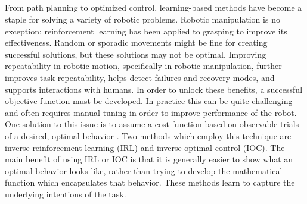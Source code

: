 \documentclass{article}
\begin{document}
\subsection{}

    
    From path planning to optimized control, learning-based methods have become a staple for solving a variety of robotic problems. Robotic manipulation is no exception; reinforcement learning has been applied to grasping to improve its effectiveness. Random or sporadic movements might be fine for creating successful solutions, but these solutions may not be optimal. Improving repeatability in robotic motion, specifically in robotic manipulation, further improves task repeatability, helps detect failures and recovery modes, and supports interactions with humans\cite{kalakrishnan2013learning}. In order to unlock these benefits, a successful objective function must be developed. In practice this can be quite challenging and often requires manual tuning in order to improve performance of the robot. One solution to this issue is to assume a cost function based on observable trials of a desired, optimal behavior \cite{kalakrishnan2013learning}. Two methods which employ this technique are inverse reinforcement learning (IRL) and inverse optimal control (IOC). The main benefit of using IRL or IOC is that it is generally easier to show what an optimal behavior looks like, rather than trying to develop the mathematical function which encapsulates that behavior. These methods learn to capture the underlying intentions of the task. 
\end{document}
